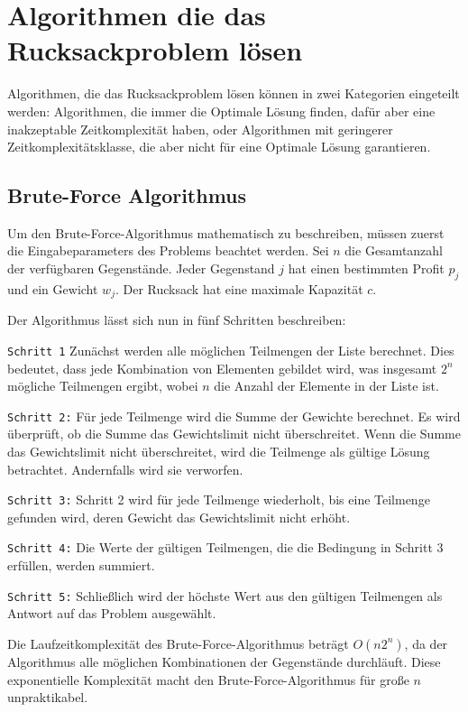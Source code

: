 
\chapter{Algorithmen die das Rucksackproblem lösen}
Algorithmen, die das Rucksackproblem lösen können in zwei Kategorien 
eingeteilt werden: Algorithmen, die immer die Optimale Lösung finden, 
dafür aber eine inakzeptable Zeitkomplexität haben, 
oder Algorithmen mit geringerer Zeitkomplexitätsklasse, die 
aber nicht für eine Optimale Lösung garantieren.

\section{Brute-Force Algorithmus}
Um den Brute-Force-Algorithmus mathematisch zu beschreiben, 
müssen zuerst die Eingabeparameters des Problems beachtet werden. Sei 
$n$ die Gesamtanzahl der verfügbaren Gegenstände. Jeder 
Gegenstand $j$ hat einen bestimmten Profit $p_j$ und ein Gewicht $w_j$. 
Der Rucksack hat eine maximale Kapazität $c$.

Der Algorithmus lässt sich nun in fünf Schritten beschreiben:

\texttt{Schritt 1}
Zunächst werden alle möglichen Teilmengen der Liste berechnet. 
Dies bedeutet, dass jede Kombination von Elementen gebildet 
wird, was insgesamt $2^n$ mögliche Teilmengen ergibt, wobei $n$ 
die Anzahl der Elemente in der Liste ist.

\texttt{Schritt 2:}
Für jede Teilmenge wird die Summe der Gewichte berechnet. 
Es wird überprüft, ob die Summe das Gewichtslimit nicht 
überschreitet. Wenn die Summe das Gewichtslimit nicht 
überschreitet, wird die Teilmenge als gültige Lösung 
betrachtet. Andernfalls wird sie verworfen.

\texttt{Schritt 3:}
Schritt 2 wird für jede Teilmenge wiederholt, bis eine 
Teilmenge gefunden wird, deren Gewicht das Gewichtslimit 
nicht erhöht.

\texttt{Schritt 4:}
Die Werte der gültigen Teilmengen, die die Bedingung in 
Schritt 3 erfüllen, werden summiert.

\texttt{Schritt 5:}
Schließlich wird der höchste Wert aus den gültigen 
Teilmengen als Antwort auf das Problem ausgewählt.\ \cite[vgl.]{balogun2022explanatory}

Die Laufzeitkomplexität des Brute-Force-Algorithmus beträgt 
$O(n2^n)$, da der Algorithmus alle möglichen Kombinationen der 
Gegenstände durchläuft. Diese exponentielle Komplexität 
macht den Brute-Force-Algorithmus für große $n$ unpraktikabel.\ \cite[vlg.]{hristakeva2005different}

